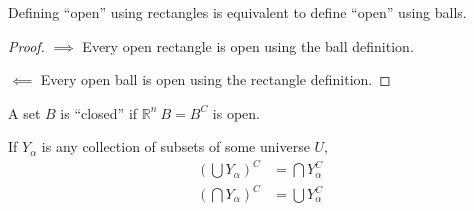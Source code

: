\documentclass[a4paper]{article}
\numberwithin{equation}{section}
\newcommand{\R}{\mathbb{R}}
\begin{document}
\begin{theorem}
    Defining ``open'' using rectangles is equivalent to define ``open'' using balls.
    \begin{proof}
        $\implies$ Every open rectangle is open using the ball definition.
        
        $\impliedby$ Every open ball is open using the rectangle definition.
    \end{proof}
\end{theorem}

\begin{definition}
    A set $B$ is ``closed'' if $\R^n \ B=B^C$ is open. 
\end{definition}

\begin{proposition}
   
    If $Y_\alpha$ is any collection of subsets of some universe $U$,
    \begin{align}
        \left(\bigcup Y_\alpha\right)^C&=\bigcap Y_\alpha^C\\
        \left(\bigcap Y_\alpha\right)^C&=\bigcup Y_\alpha^C
    \end{align}
\end{proposition}
\end{document}
